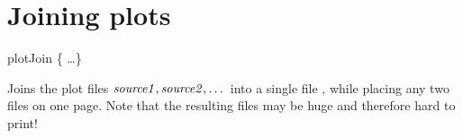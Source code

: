 \section{Joining plots}
\begin{essyntax}
  plotJoin \{   \dots \} 
\end{essyntax}
Joins the plot files $\mathrm{\mathit{source1}}, \mathrm{\mathit{source2}}, \dots$ into a
single file , while placing any two files on one page.
Note that the resulting files may be huge and therefore hard to print!


